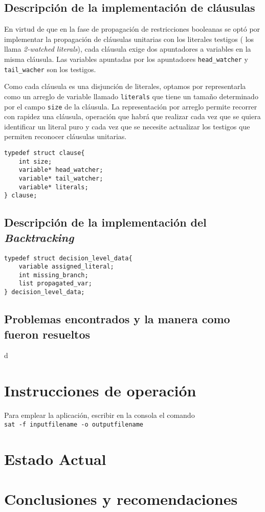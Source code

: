 \documentclass[12pt,lettersize]{article}
\begin{document}
\subsection{Descripción de la implementación de cláusulas}
En virtud de que en la fase de propagación de restricciones booleanas se optó
por implementar la propagación de cláusulas unitarias con los literales testigos
(\cite{} los llama \emph{2-watched literals}), cada cláusula exige
dos apuntadores a variables en la misma cláusula. Las variables apuntadas por
los apuntadores {\tt head\_watcher} y {\tt tail\_wacher} son los testigos.

Como cada cláusula es una disjunción de literales, optamos por representarla
como un arreglo de variable llamado {\tt literals} que tiene un tamaño
determinado por el campo {\tt size} de la cláusula. La representación por
arreglo permite recorrer con rapidez una cláusula, operación que habrá que
realizar cada vez que se quiera identificar un literal puro y cada vez que se
necesite actualizar los testigos que permiten reconocer cláusulas unitarias.

\begin{lstlisting}
typedef struct clause{
    int size;
    variable* head_watcher;
    variable* tail_watcher;
    variable* literals;
} clause;
\end{lstlisting}

\subsection{Descripción de la implementación del \emph{Backtracking}}

\begin{lstlisting}
typedef struct decision_level_data{
    variable assigned_literal;
    int missing_branch;                                                
    list propagated_var;
} decision_level_data;
\end{lstlisting}


\subsection{Problemas encontrados y la manera como fueron resueltos}


\begin{texttt}
d
\end{texttt}

\section{Instrucciones de operación}
Para emplear la aplicación, escribir en la consola el comando
\\ \texttt{sat -f inputfilename -o outputfilename}
\section{Estado Actual}

\section{Conclusiones y recomendaciones}
\end{document}
